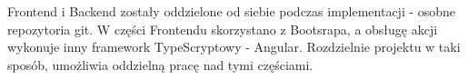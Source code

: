 Frontend i Backend zostały oddzielone od siebie podczas implementacji - osobne repozytoria git.
W części Frontendu skorzystano z Bootsrapa, a obsługę akcji wykonuje inny framework TypeScryptowy - Angular.
Rozdzielnie projektu w taki sposób, umożliwia oddzielną pracę nad tymi częściami.